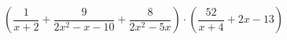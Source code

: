 \begin{ex}[type=simplify_calculate]
	\begin{condition}
		\(\left( \dfrac{1}{x+2}+\dfrac{9}{2x^2-x-10}+\dfrac{8}{2x^2-5x} \right)\cdot\left( \dfrac{52}{x+4}+2x-13 \right)\)
	\end{condition}
\end{ex}